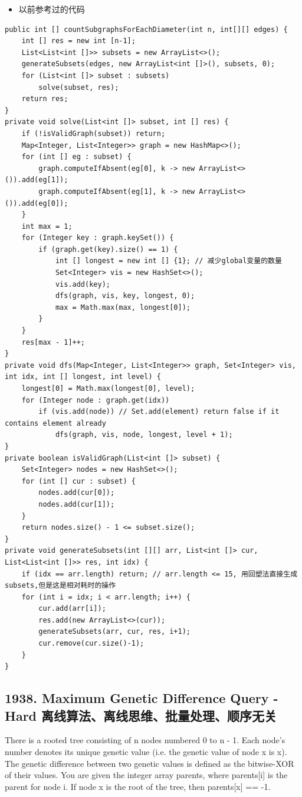 \documentclass[9pt, b5paaper]{book}
\begin{document}
\begin{enumerate}
\begin{itemize}
\item 以前参考过的代码
\end{itemize}
\begin{verbatim}
public int [] countSubgraphsForEachDiameter(int n, int[][] edges) {
    int [] res = new int [n-1];
    List<List<int []>> subsets = new ArrayList<>();
    generateSubsets(edges, new ArrayList<int []>(), subsets, 0);
    for (List<int []> subset : subsets) 
        solve(subset, res);
    return res;
}
private void solve(List<int []> subset, int [] res) {
    if (!isValidGraph(subset)) return;
    Map<Integer, List<Integer>> graph = new HashMap<>();
    for (int [] eg : subset) {
        graph.computeIfAbsent(eg[0], k -> new ArrayList<>()).add(eg[1]);
        graph.computeIfAbsent(eg[1], k -> new ArrayList<>()).add(eg[0]);
    }
    int max = 1;
    for (Integer key : graph.keySet()) {
        if (graph.get(key).size() == 1) {
            int [] longest = new int [] {1}; // 减少global变量的数量
            Set<Integer> vis = new HashSet<>();
            vis.add(key);
            dfs(graph, vis, key, longest, 0);
            max = Math.max(max, longest[0]);
        }
    }
    res[max - 1]++;
}
private void dfs(Map<Integer, List<Integer>> graph, Set<Integer> vis, int idx, int [] longest, int level) {
    longest[0] = Math.max(longest[0], level);
    for (Integer node : graph.get(idx)) 
        if (vis.add(node)) // Set.add(element) return false if it contains element already
            dfs(graph, vis, node, longest, level + 1);
}
private boolean isValidGraph(List<int []> subset) {
    Set<Integer> nodes = new HashSet<>();
    for (int [] cur : subset) {
        nodes.add(cur[0]);
        nodes.add(cur[1]);
    }
    return nodes.size() - 1 <= subset.size();
}
private void generateSubsets(int [][] arr, List<int []> cur, List<List<int []>> res, int idx) {
    if (idx == arr.length) return; // arr.length <= 15, 用回塑法直接生成subsets,但是这是相对耗时的操作
    for (int i = idx; i < arr.length; i++) {
        cur.add(arr[i]);
        res.add(new ArrayList<>(cur));
        generateSubsets(arr, cur, res, i+1);
        cur.remove(cur.size()-1);
    }
}
\end{verbatim}
\end{enumerate}

\subsection{1938. Maximum Genetic Difference Query - Hard 离线算法、离线思维、批量处理、顺序无关}
\label{sec-2-1-7}
There is a rooted tree consisting of n nodes numbered 0 to n - 1. Each node's number denotes its unique genetic value (i.e. the genetic value of node x is x). The genetic difference between two genetic values is defined as the bitwise-XOR of their values. You are given the integer array parents, where parents[i] is the parent for node i. If node x is the root of the tree, then parents[x] == -1.
\end{document}
